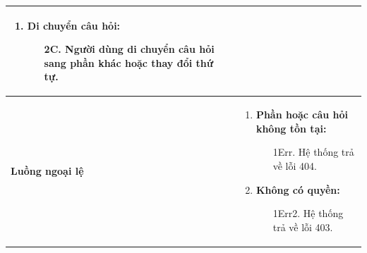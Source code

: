 {\begin{tabularx}{\textwidth}{|>{\raggedright\arraybackslash}X|>{\raggedright\arraybackslash}X|}
\begin{enumerate}
    \item \textbf{Di chuyển câu hỏi:}
    \begin{enumerate}
        \item[2C.] Người dùng di chuyển câu hỏi sang phần khác hoặc thay đổi thứ tự.
    \end{enumerate}
\end{enumerate} \\
\hline
\textbf{Luồng ngoại lệ} &
\begin{enumerate}
    \item \textbf{Phần hoặc câu hỏi không tồn tại:}
    \begin{enumerate}
        \item[1Err.] Hệ thống trả về lỗi 404.
    \end{enumerate}
    \item \textbf{Không có quyền:}
    \begin{enumerate}
        \item[1Err2.] Hệ thống trả về lỗi 403.
    \end{enumerate}
\end{enumerate} \\
\hline
\end{tabularx}
}
